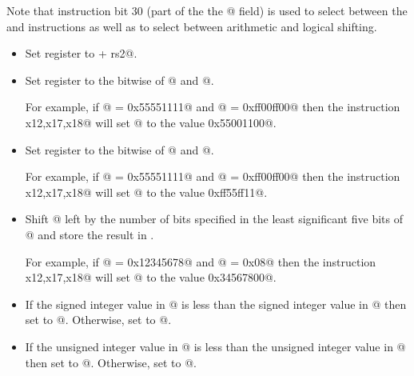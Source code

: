Note that instruction bit 30 (part of the the @ field) 
is used to select between the \verb@add@ and \verb@sub@ instructions 
as well as to select between arithmetic and logical shifting.

\begin{itemize}
\item{}
\label{insn:add}

Set register \verb@rd@ to  + rs2@.

\item{}
\label{insn:and}

Set register \verb@rd@ to the bitwise \verb@and@ of @ and  @.

For example, if @ = \verb@0x55551111@ and @ = \verb@0xff00ff00@
then the instruction \verb@and x12,x17,x18@ will set @ to the
value \verb@0x55001100@.

\item{}
\label{insn:or}

Set register \verb@rd@ to the bitwise \verb@or@ of @ and  @.

For example, if @ = \verb@0x55551111@ and @ = \verb@0xff00ff00@
then the instruction \verb@or x12,x17,x18@ will set @ to the
value \verb@0xff55ff11@.

\item{}
\label{insn:sll}

Shift @ left by the number of bits specified in the least significant
five bits of @ and store the result in \verb@rd@.

For example, if @ = \verb@0x12345678@ and @ = \verb@0x08@
then the instruction \verb@sll x12,x17,x18@ will set @ to the
value \verb@0x34567800@.

\item{}
\label{insn:slt}

If the signed integer value in @ is less than the
signed integer value in @ then set \verb@rd@ to @.
Otherwise, set \verb@rd@ to @.

\item{}
\label{insn:sltu}

If the unsigned integer value in @ is less than the
unsigned integer value in @ then set \verb@rd@ to @.
Otherwise, set \verb@rd@ to @.


\end{itemize}
